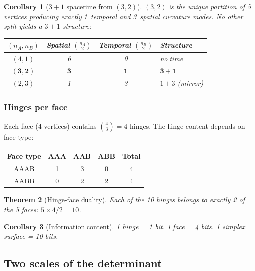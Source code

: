 \documentclass[12pt]{article}
\newtheorem{theorem}{Theorem}[section]
\newtheorem{corollary}[theorem]{Corollary}
\theoremstyle{remark}
\theoremstyle{definition}
\begin{document}
\begin{corollary}[$3+1$ spacetime from $(3,2)$]
\label{cor:31_spacetime}
$(3,2)$ is the \emph{unique} partition of 5 vertices producing exactly 1~temporal and 3~spatial curvature modes.  No other split yields a $3+1$ structure:

\begin{center}
\begin{tabular}{cccl}
\toprule
$(n_A,n_B)$ & Spatial $\binom{n_A}{2}$ & Temporal $\binom{n_B}{2}$ & Structure \\
\midrule
$(4,1)$ & 6 & 0 & no time \\
$\mathbf{(3,2)}$ & $\mathbf{3}$ & $\mathbf{1}$ & $\boldsymbol{3+1}$ \\
$(2,3)$ & 1 & 3 & $1+3$ (mirror) \\
\bottomrule
\end{tabular}
\end{center}
\end{corollary}

\subsubsection{Hinges per face}

Each face (4 vertices) contains $\binom{4}{3} = 4$ hinges. The hinge content depends on face type:

\begin{center}
\begin{tabular}{ccccc}
\hline
Face type & AAA & AAB & ABB & Total \\
\hline
AAAB & 1 & 3 & 0 & 4 \\
AABB & 0 & 2 & 2 & 4 \\
\hline
\end{tabular}
\end{center}

\begin{theorem}[Hinge-face duality]
\label{thm:hinge_face}
Each of the 10 hinges belongs to exactly 2 of the 5 faces: $5 \times 4 / 2 = 10$.
\end{theorem}

\begin{corollary}[Information content]
1 hinge = 1 bit. 1 face = 4 bits. 1 simplex surface = 10 bits.
\end{corollary}

\subsection{Two scales of the determinant}
\end{document}
